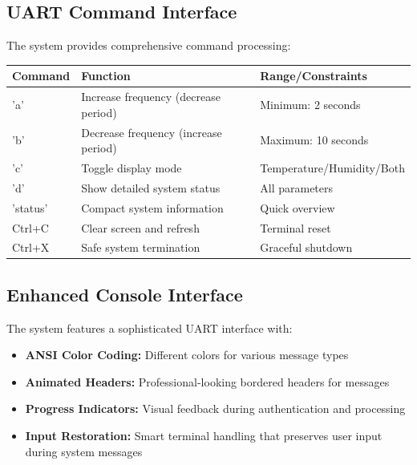 \documentclass[12pt,a4paper]{article}
\begin{document}
\subsection{UART Command Interface}
The system provides comprehensive command processing:

\begin{tcolorbox}[mybox]
\begin{center}
\begin{tabular}{|l|l|l|}
\hline
\textbf{Command} & \textbf{Function} & \textbf{Range/Constraints} \\
\hline
'a' & Increase frequency (decrease period) & Minimum: 2 seconds \\
\rowcolor{lightbluegray!55}
'b' & Decrease frequency (increase period) & Maximum: 10 seconds \\
'c' & Toggle display mode & Temperature/Humidity/Both \\
\rowcolor{lightbluegray!55}
'd' & Show detailed system status & All parameters \\
'status' & Compact system information & Quick overview \\
\rowcolor{lightbluegray!55}
Ctrl+C & Clear screen and refresh & Terminal reset \\
Ctrl+X & Safe system termination & Graceful shutdown \\
\hline
\end{tabular}
\end{center}
\end{tcolorbox}

\subsection{Enhanced Console Interface}
The system features a sophisticated UART interface with:

\begin{tcolorbox}[mybox]
\begin{itemize}[label=\textcolor{myblue}{$\star$}, itemsep=1.5mm]
    \item \textbf{ANSI Color Coding:} Different colors for various message types
    \item \textbf{Animated Headers:} Professional-looking bordered headers for messages
    \item \textbf{Progress Indicators:} Visual feedback during authentication and processing
    \item \textbf{Input Restoration:} Smart terminal handling that preserves user input during system messages
\end{itemize}
\end{tcolorbox}
\end{document}
